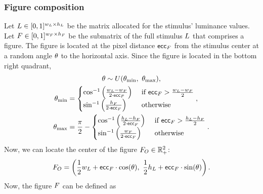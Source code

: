 \subsubsection{Figure composition}
\label{sec:figure-composition}

Let $L \in [0, 1]^{w_L \times h_L}$ be the matrix allocated for the stimulus' luminance values.
Let $F \in [0, 1]^{{w_F} \times {h_F}}$ be the submatrix of the full stimulus $L$ that comprises a figure. The figure is located at the pixel distance $\mathsf{ecc}_F$ from the stimulus center at a random angle $\theta$ to the horizontal axis. Since the figure is located in the bottom right quadrant,
\begin{equation}
\begin{gathered}
    \theta \sim U (\theta_{\min}, \ \theta_{\max}), \\
    \begin{aligned}
        \theta_{\min} &=
        \begin{cases}
            \cos^{-1} \left(
                \frac{w_L - {w_F}}{2 \cdot \mathsf{ecc}_F}
            \right)
            &\text{ if } \mathsf{ecc}_F > \frac{w_L - {w_F}}{2} \\
            \sin^{-1} \left( 
                \frac{{h_F}}{2 \cdot \mathsf{ecc}_F}
            \right)
            &\text{ otherwise}
        \end{cases}, \\
        \theta_{\max} &= \frac{\pi}{2} - 
        \begin{cases}
            \cos^{-1} \left(
                \frac{h_L - {h_F}}{2 \cdot \mathsf{ecc}_F}
            \right)
            &\text{ if } \mathsf{ecc}_F > \frac{h_L - {h_F}}{2} \\
            \sin^{-1} \left( 
                \frac{{w_F}}{2 \cdot \mathsf{ecc}_F}
            \right)
            &\text{ otherwise}
        \end{cases}.
    \end{aligned}
\end{gathered}
\end{equation}
Now, we can locate the center of the figure $F_O \in \mathbb{R}_+^2$:
\begin{equation}
    F_O = \left(
        \frac{1}{2} w_L + \mathsf{ecc}_F \cdot \cos(\theta), \
        \frac{1}{2} h_L + \mathsf{ecc}_F \cdot \sin(\theta)
    \right).
\end{equation}
Now, the figure $F$ can be defined as
